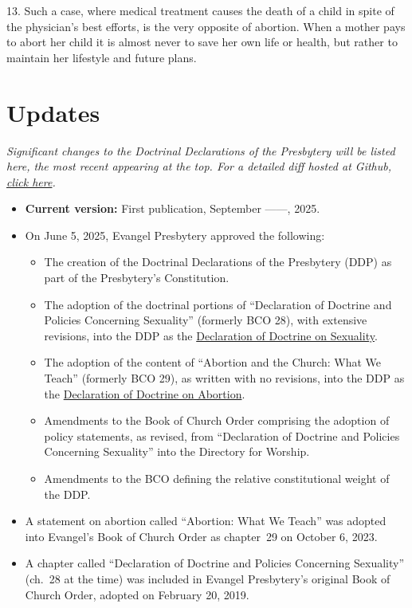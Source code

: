 \documentclass[
]{book}
\providecommand{\tightlist}{%
  \setlength{\itemsep}{0pt}\setlength{\parskip}{0pt}}
\begin{document}
13. Such a case, where medical treatment causes the death of a child in spite of the physician's best efforts, is the very opposite of abortion. When a mother pays to abort her child it is almost never to save her own life or health, but rather to maintain her lifestyle and future plans.

\hypertarget{updates}{%
\chapter*{Updates}\label{updates}}

\emph{Significant changes to the Doctrinal Declarations of the Presbytery will be listed here, the most recent appearing at the top. For a detailed diff hosted at Github, \href{https://github.com/Evangel-Presbytery/evangel-ddp}{click here}.}

\begin{itemize}
\tightlist
\item
  \textbf{Current version:} First publication, September ------, 2025.
\item
  On June 5, 2025, Evangel Presbytery approved the following:

  \begin{itemize}
  \tightlist
  \item
    The creation of the Doctrinal Declarations of the Presbytery (DDP) as part of the Presbytery's Constitution.
  \item
    The adoption of the doctrinal portions of ``Declaration of Doctrine and Policies Concerning Sexuality'' (formerly BCO 28), with extensive revisions, into the DDP as the \protect\hyperlink{declaration-of-doctrine-on-sexuality}{Declaration of Doctrine on Sexuality}.
  \item
    The adoption of the content of ``Abortion and the Church: What We Teach'' (formerly BCO 29), as written with no revisions, into the DDP as the \protect\hyperlink{declaration-of-doctrine-on-abortion}{Declaration of Doctrine on Abortion}.
  \item
    Amendments to the Book of Church Order comprising the adoption of policy statements, as revised, from ``Declaration of Doctrine and Policies Concerning Sexuality'' into the Directory for Worship.
  \item
    Amendments to the BCO defining the relative constitutional weight of the DDP.
  \end{itemize}
\item
  A statement on abortion called ``Abortion: What We Teach'' was adopted into Evangel's Book of Church Order as chapter~29 on October 6, 2023.
\item
  A chapter called ``Declaration of Doctrine and Policies Concerning Sexuality'' (ch.~28 at the time) was included in Evangel Presbytery's original Book of Church Order, adopted on February 20, 2019.
\end{itemize}
\end{document}
